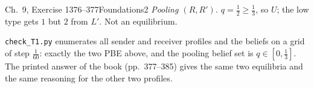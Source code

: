 \begin{exsol}{\MG{} Ch.~9, Exercise 1}{376--377}{Foundations}{2}
\emph{Pooling $(R, R')$.} $q = \frac12 \ge \frac13$, so $U$; the low type gets $1$ but $2$ from $L'$.
Not an equilibrium.

\verify \texttt{check\_T1.py} enumerates all sender and receiver profiles and the beliefs on a
grid of step $\frac1{60}$: exactly the two PBE above, and the pooling belief set is
$q \in [0, \frac13]$. The printed answer of the book (pp.~377--385) gives the same two equilibria
and the same reasoning for the other two profiles.

\end{exsol}
